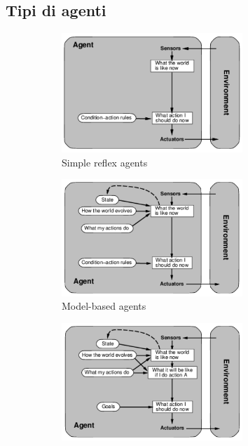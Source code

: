 \documentclass[11pt,oneside]{book}
\begin{document}
\subsection{Tipi di agenti}
\begin{figure}[htp]
	\begin{subfigure}{0.49\textwidth}
	    \centering
		\includegraphics[width=0.75\textwidth]{simple-reflex.png} 
		\caption{Simple reflex agents}
	\end{subfigure}
	\hfill
	\begin{subfigure}{0.49\textwidth}
	    \centering
		\includegraphics[width=0.75\textwidth]{model-based.png} 
		\caption{Model-based agents}
	\end{subfigure}
	\begin{subfigure}{0.49\textwidth}
	    \centering
		\includegraphics[width=0.75\textwidth]{goal-based.png}

\end{subfigure}
\end{figure}
\end{document}
